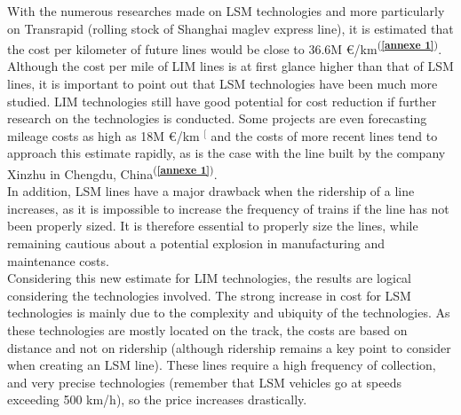 \documentclass[12pt, a4paper, onecolumn]{article}
\makeatletter
\renewcommand{\tab}{\tabto{15px}}
\newcommand{\csvdel}{}
\newcommand{\bettercite}[1][,]{%
  \renewcommand{\csvdel}{\renewcommand{\csvdel}{}}%
  \csname\endcsname$^[$\checknextarg}
\newcommand{\checknextarg}{\@ifnextchar\bgroup{\gobblenext}{}}%
\newcommand{\gobblenext}[1]{\csvdel\textcolor{blue}{\textbf{\cite{#1}}}\@ifnextchar\bgroup{$^,$\gobblenext}{$^]$}}%
\newcommand{\cfannexe}[1]{\textsuperscript{(\textcolor{blue}{\textbf{\ref{annexe #1}}})}}
\makeatother
\begin{document}
With the numerous researches made on LSM technologies and more particularly on Transrapid (rolling stock of Shanghai maglev express line), it is estimated that the cost per kilometer of future lines would be close to 36.6M \euro/km\cfannexe{1}. \\
\linebreak
\tab Although the cost per mile of LIM lines is at first glance higher than that of LSM lines, it is important to point out that LSM technologies have been much more studied.
LIM technologies still have good potential for cost reduction if further research on the technologies is conducted.
Some projects are even forecasting mileage costs as high as 18M \euro/km\bettercite{coloradomaglev} and the costs of more recent lines tend to approach this estimate rapidly, as is the case with the line built by the company Xinzhu in Chengdu, China\cfannexe{1}. \\
\tab In addition, LSM lines have a major drawback when the ridership of a line increases, as it is impossible to increase the frequency of trains if the line has not been properly sized.
It is therefore essential to properly size the lines, while remaining cautious about a potential explosion in manufacturing and maintenance costs. \\
\tab Considering this new estimate for LIM technologies, the results are logical considering the technologies involved.
The strong increase in cost for LSM technologies is mainly due to the complexity and ubiquity of the technologies.
As these technologies are mostly located on the track, the costs are based on distance and not on ridership (although ridership remains a key point to consider when creating an LSM line).
These lines require a high frequency of collection, and very precise technologies (remember that LSM vehicles go at speeds exceeding 500 km/h), so the price increases drastically. \\
\end{document}
